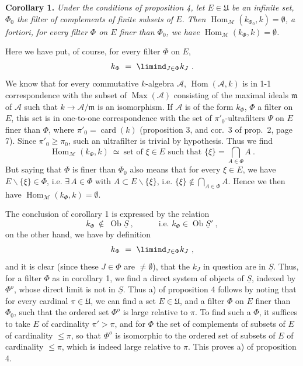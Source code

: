 \textbf{Corollary 1.} \textit{Under the conditions of proposition 4, let $E\in\mathfrak{U}$ be an infinite set, $\Phi_0$ the filter of complements of finite subsets of $E$. Then $\operatorname{Hom}_{\mathcal{M}}(k_{\Phi_0},k)=\emptyset$, a fortiori, for every filter $\Phi$ on $E$ finer than $\Phi_0$, we have $\operatorname{Hom}_{\mathcal{M}}(k_\Phi,k)=\emptyset$.}

Here we have put, of course, for every filter $\Phi$ on $E$,
\[
k_\Phi\ =\ \limind_{J\in\Phi}k_J\ .
\]
We know that for every commutative $k$-algebra $\mathcal{A}$, $\operatorname{Hom}(\mathcal{A},k)$ is in 1-1 correspondence with the subset of $\operatorname{Max}(\mathcal{A})$ consisting of the maximal ideals $\mathfrak{m}$ of $\mathcal{A}$ such that $k\longrightarrow\mathcal{A}/\mathfrak{m}$ is an isomorphism. If $\mathcal{A}$ is of the form $k_\Phi$, $\Phi$ a filter on $E$, this set is in one-to-one correspondence with the set of $\pi'_0$-ultrafilters $\Psi$ on $E$ finer than $\Phi$, where $\pi'_0=\operatorname{card}(k)$ (proposition 3, and cor.~3 of prop.~2, page 7). Since $\pi'_0\geqslant\pi_0$, such an ultrafilter is trivial by hypothesis. Thus we find
\[
\operatorname{Hom}_{\mathcal{M}}(k_\Phi,k)\ \simeq\ \text{set of } \xi\in E \text{ such that } \{\xi\}=\textstyle\bigcap_{A\in\Phi}A\ . \tag*{$(*)$}
\]
But saying that $\Phi$ is finer than $\Phi_0$ also means that for every $\xi\in E$, we have $E\backslash\{\xi\}\in\Phi$, i.e. $\exists\,A\in\Phi$ with $A\subset E\backslash\{\xi\}$, i.e. $\{\xi\}\notin\bigcap_{A\in\Phi}A$. Hence we then have $\operatorname{Hom}_{\mathcal{M}}(k_\Phi,k)=\emptyset$.

The conclusion of corollary 1 is expressed by the relation
\[
k_\Phi\ \notin\ \operatorname{Ob}\underline{S}\ ,\qquad\quad \text{i.e. } k_\Phi\in\operatorname{Ob}\underline{S}'\ ,
\]
on the other hand, we have by definition
\[
k_\Phi\ =\ \limind_{J\in\Phi}k_J\ ,
\]
and it is clear (since these $J\in\Phi$ are $\neq\emptyset$), that the $k_J$ in question are in $\underline{S}$. Thus, for a filter $\Phi$ as in corollary 1, we find a direct system of objects of $\underline{S}$, indexed by $\Phi^o$, whose direct limit is not in $\underline{S}$. Thus a) of proposition 4 follows by noting that for every cardinal $\pi\in\mathfrak{U}$, we can find a set $E\in\mathfrak{U}$, and a filter $\Phi$ on $E$ finer than $\Phi_0$, such that the ordered set $\Phi^o$ is large relative to $\pi$. To find such a $\Phi$, it suffices to take $E$ of cardinality $\pi'>\pi$, and for $\Phi$ the set
of complements of subsets of $E$ of cardinality $\leqslant\pi$, so that $\Phi^o$ is isomorphic to the ordered set of subsets of $E$ of cardinality $\leqslant\pi$, which is indeed large relative to $\pi$. This proves a) of proposition 4.

